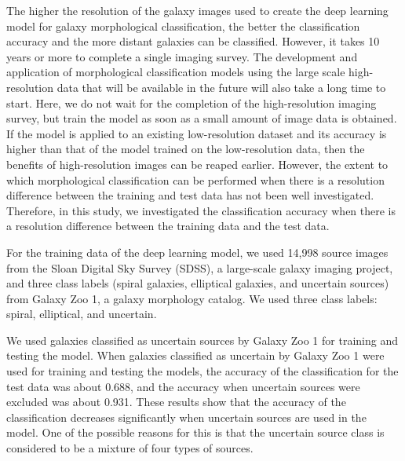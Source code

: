 \documentclass[a4j, 11pt]{jreport}
\begin{document}
The higher the resolution of the galaxy images used to create the deep learning model for galaxy morphological classification, the better the classification accuracy and the more distant galaxies can be classified. However, it takes 10 years or more to complete a single imaging survey. The development and application of morphological classification models using the large scale high-resolution data that will be available in the future will also take a long time to start. Here, we do not wait for the completion of the high-resolution imaging survey, but train the model as soon as a small amount of image data is obtained. If the model is applied to an existing low-resolution dataset and its accuracy is higher than that of the model trained on the low-resolution data, then the benefits of high-resolution images can be reaped earlier. However, the extent to which morphological classification can be performed when there is a resolution difference between the training and test data has not been well investigated. Therefore, in this study, we investigated the classification accuracy when there is a resolution difference between the training data and the test data.

For the training data of the deep learning model, we used 14,998 source images from the Sloan Digital Sky Survey (SDSS), a large-scale galaxy imaging project, and three class labels (spiral galaxies, elliptical galaxies, and uncertain sources) from Galaxy Zoo 1, a galaxy morphology catalog. We used three class labels: spiral, elliptical, and uncertain.

We used galaxies classified as uncertain sources by Galaxy Zoo 1 for training and testing the model. When galaxies classified as uncertain by Galaxy Zoo 1 were used for training and testing the models, the accuracy of the classification for the test data was about 0.688, and the accuracy when uncertain sources were excluded was about 0.931.
These results show that the accuracy of the classification decreases significantly when uncertain sources are used in the model. One of the possible reasons for this is that the uncertain source class is considered to be a mixture of four types of sources.
\end{document}
